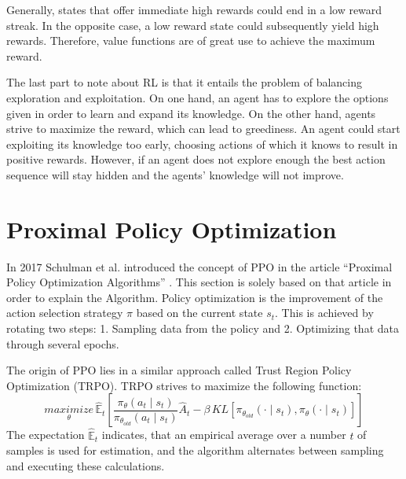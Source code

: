 Generally, states that offer immediate high rewards could end in a 
low reward streak. In the opposite case, a low reward state could subsequently yield high rewards. Therefore, value functions are of great use to achieve the maximum reward.

The last part to note about RL is that it entails the problem of balancing exploration and exploitation. On one hand, an agent has to explore the options given in order to learn and expand its knowledge. On the other hand, agents strive to maximize the reward, which can lead to greediness. An agent could start exploiting its knowledge too early,  choosing actions of which it knows to result in positive rewards. However, if an agent does not explore enough the best action sequence will stay hidden and the agents' knowledge will not improve.

\section{Proximal Policy Optimization}
In 2017 Schulman et al. introduced the concept of PPO in
the article ``Proximal Policy Optimization Algorithms'' \cite{scwo17}.
This section is solely based on that article in order to explain the Algorithm.
Policy optimization is the improvement of the action selection strategy $\pi$ based on the current state $s_{t}$. This is achieved by rotating two steps: 1. Sampling data from the policy and 2. Optimizing that data through several epochs.

The origin of PPO lies in a similar approach called Trust Region Policy Optimization (TRPO). TRPO strives to maximize the following function:
\begin{equation}\label{eq:TRPO}
    \underset{\theta}{maximize}\,\hat{\mathbb{E}}_{t} \left[ \frac{\pi_{\theta}(a_{t} \mid s_{t})}{\pi_{\theta_{old}}(a_{t} \mid s_{t})}
        \hat{A}_{t}-\beta \, KL[\pi_{\theta_{old}}(\cdot \mid s_{t}),\pi_{\theta}(\cdot \mid s_{t})] \right]
\end{equation}
The expectation $\hat{\mathbb{E}}_{t}$ indicates, that an  empirical average over a number $t$ of samples is used for estimation, and the algorithm alternates between sampling and executing these calculations.
 
